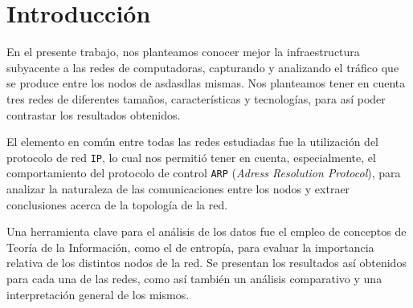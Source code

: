 \section{Introducción}

En el presente trabajo, nos planteamos conocer mejor la infraestructura
subyacente a las redes de computadoras, capturando y analizando el tráfico que
se produce entre los nodos de asdasdlas mismas. Nos planteamos tener en cuenta tres
redes de diferentes tamaños, características y tecnologías, para así poder
contrastar los resultados obtenidos.

El elemento en común entre todas las redes estudiadas fue la utilización del
protocolo de red \texttt{IP}, lo cual nos permitió tener en cuenta,
especialmente, el comportamiento del protocolo de control \texttt{ARP}
(\textit{Adress Resolution Protocol}), para analizar la naturaleza de las
comunicaciones entre los nodos y extraer conclusiones acerca de la topología
de la red.

Una herramienta clave para el análisis de los datos fue el empleo de conceptos
de Teoría de la Información, como el de entropía, para evaluar la importancia
relativa de los distintos nodos de la red. Se presentan los resultados así
obtenidos para cada una de las redes, como así también un análisis comparativo
y una interpretación general de los mismos.
